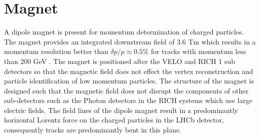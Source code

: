 \section{Magnet}
\label{section: magnet}

A dipole magnet is present for momentum determination of charged particles. The magnet provides an integrated downstream field of $3.6$ Tm which results in a momentum resolution better than $\delta p / p \approx 0.5\%$ for tracks with momentum less than 200 GeV \cite{Amato:424338}. The magnet is positioned after the VELO and RICH 1 sub detectors so that the magnetic field does not effect the vertex reconstruction and particle identification of low momentum particles. The structure of the magnet is designed such that the magnetic field does not disrupt the components of other sub-detectors such as the Photon detectors in the RICH systems which use large electric fields. The field lines of the dipole magnet result in a predominantly horizontal Lorentz force on the charged particles in the LHCb detector, consequently tracks are predominantly bent in this plane.